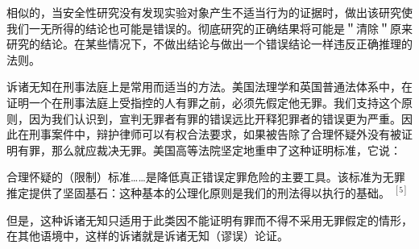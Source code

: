相似的，当安全性研究没有发现实验对象产生不适当行为的证据时，做出该研究使我们一无所得的结论也可能是错误的。彻底研究的正确结果将可能是＂清除＂原来研究的结论。在某些情况下，不做出结论与做出一个错误结论一样违反正确推理的法则。

诉诸无知在刑事法庭上是常用而适当的方法。美国法理学和英国普通法体系中，在证明一个在刑事法庭上受指控的人有罪之前，必须先假定他无罪。我们支持这个原则，因为我们认识到，宣判无罪者有罪的错误远比开释犯罪者的错误更为严重。因此在刑事案件中，辩护律师可以有权合法要求，如果被告除了合理怀疑外没有被证明有罪，那么就应裁决无罪。美国高等法院坚定地重申了这种证明标准，它说：

合理怀疑的（限制）标准……是降低真正错误定罪危险的主要工具。该标准为无罪推定提供了坚固基石：这种基本的公理化原则是我们的刑法得以执行的基础。 ${ }^{[5]}$

但是，这种诉诸无知只适用于此类因不能证明有罪而不得不采用无罪假定的情形，在其他语境中，这样的诉诸就是诉诸无知（谬误）论证。 